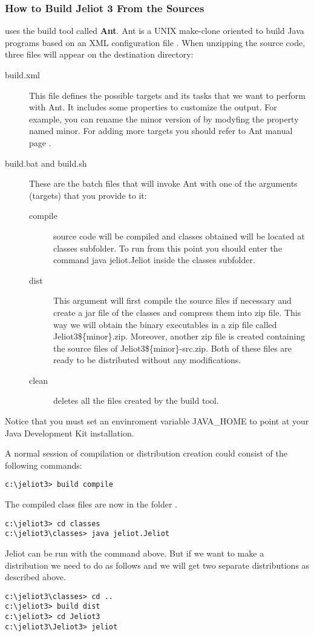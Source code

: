 \subsubsection{How to Build Jeliot 3 From the Sources}

\jel{} uses the build tool called {\bf Ant}.
Ant is a UNIX make-clone oriented to build Java
programs based on an XML configuration file \citep{Ant}.
When unzipping the source code, three files will appear on the
destination directory:
\begin{description}
\item[build.xml] This file defines the possible targets and its tasks
that we want to perform with Ant. It includes some properties
to customize the output. For example, you can rename the minor
version of \jel{} by modyfing the property named minor. For adding
more targets you should refer to Ant manual page
\citep{AntManual}.
\item[build.bat and build.sh] These are the batch files that
will invoke Ant with one of the arguments (targets) that you
provide to it:
\begin{description}
\item[compile] \jel{} source code will be compiled and classes obtained
will be located at classes subfolder. To run \jel{} from this
point you should enter the command java jeliot.Jeliot inside
the classes subfolder.
\item[dist] This argument will first compile the source files if
necessary and create a jar file of the classes and compress them
into zip file. This way we will obtain the binary executables
in a zip file called {Jeliot3\$\{minor\}.zip}. Moreover, another
zip file is created containing the source files of \jel{}
{Jeliot3\$\{minor\}-src.zip}. Both of these files are ready to be
distributed without any modifications.
\item[clean] deletes all the files created by the build tool.
\end{description}
\end{description}

Notice that you must set an envinroment variable {JAVA\_HOME}
to point at your Java Development Kit installation.

A normal session of compilation or distribution creation
could consist of the following commands:

\begin{verbatim}
c:\jeliot3> build compile
\end{verbatim}
The compiled class files are now in the folder .
\begin{verbatim}
c:\jeliot3> cd classes
c:\jeliot3\classes> java jeliot.Jeliot
\end{verbatim}
Jeliot can be run with the command above. But if we want to make a
distribution we need to do as follows and we will get two separate
distributions as described above.
\begin{verbatim}
c:\jeliot3\classes> cd ..
c:\jeliot3> build dist
c:\jeliot3> cd Jeliot3
c:\jeliot3\Jeliot3> jeliot
\end{verbatim}

